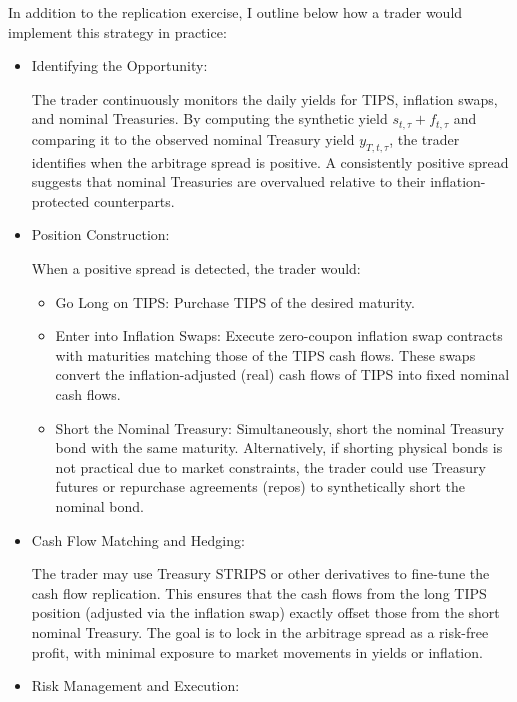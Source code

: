 \documentclass[12pt]{article}
\begin{document}
In addition to the replication exercise, I outline below how a trader would implement this strategy in practice:
\begin{itemize}
  \item Identifying the Opportunity:  
  
  The trader continuously monitors the daily yields for TIPS, inflation swaps, and nominal Treasuries. By computing the synthetic yield \(s_{t,\tau} + f_{t,\tau}\) and comparing it to the observed nominal Treasury yield \(y_{T,t,\tau}\), the trader identifies when the arbitrage spread is positive. A consistently positive spread suggests that nominal Treasuries are overvalued relative to their inflation-protected counterparts.

  \item  Position Construction:  
  
  When a positive spread is detected, the trader would:
  
  \begin{itemize}
    \item Go Long on TIPS: Purchase TIPS of the desired maturity.
    \item Enter into Inflation Swaps: Execute zero-coupon inflation swap contracts with maturities matching those of the TIPS cash flows. These swaps convert the inflation-adjusted (real) cash flows of TIPS into fixed nominal cash flows.
    \item Short the Nominal Treasury: Simultaneously, short the nominal Treasury bond with the same maturity. Alternatively, if shorting physical bonds is not practical due to market constraints, the trader could use Treasury futures or repurchase agreements (repos) to synthetically short the nominal bond.
  \end{itemize} 
  \item Cash Flow Matching and Hedging:  
  
  The trader may use Treasury STRIPS or other derivatives to fine-tune the cash flow replication. This ensures that the cash flows from the long TIPS position (adjusted via the inflation swap) exactly offset those from the short nominal Treasury. The goal is to lock in the arbitrage spread as a risk-free profit, with minimal exposure to market movements in yields or inflation.

  \item Risk Management and Execution:  


\end{itemize}
\end{document}
